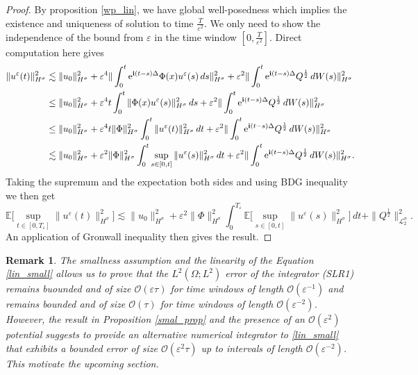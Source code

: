 \documentclass[a4paper]{amsart}
\newtheorem{remark}{Remark}[section]
\begin{document}
    \begin{proof}
By proposition \ref{wp_lin}, we have global well-posedness which implies the existence and uniqueness of solution to time $\frac{T}{\varepsilon^2}$. We only need to show the independence of the bound from $\varepsilon$ in the time window $[0,\frac{T}{\varepsilon^2}]$. Direct computation here gives 
$$
\begin{aligned}
\|u^\varepsilon(t)\|^{2}_{H^\sigma}&\lesssim \|u_0\|_{H^\sigma}^{2}+\varepsilon^{4}\|\int_{0}^{t}{\rm e}^{{\bf i}(t-s)\Delta}\Phi(x)u^\varepsilon(s)\,ds\|_{H^\sigma}^{2}+\varepsilon^{2}
\|\int_{0}^{t}{\rm e}^{{\bf i}(t-s)\Delta}Q^{\frac{1}{2}}\,dW(s)\|_{H^\sigma}^{2}\\
&\le \|u_0\|_{H^\sigma}^{2}+\varepsilon^{4} t \int_{0}^{t}\|\Phi(x)u^\varepsilon(s)\|^2_{H^\sigma}\,ds+\varepsilon^{2}
\|\int_{0}^{t}{\rm e}^{{\bf i}(t-s)\Delta}Q^{\frac{1}{2}}\,dW(s)\|_{H^\sigma}^{2}\\
&\le \|u_0\|_{H^\sigma}^{2}+\varepsilon^{4}t \|\Phi\|_{H^\sigma}^{2}\int_{0}^{t}\|u^\varepsilon(t)\|^{2}_{H^\sigma}\,dt+\varepsilon^{2}
\|\int_{0}^{t}{\rm e}^{{\bf i}(t-s)\Delta}Q^{\frac{1}{2}}\,dW(s)\|_{H^\sigma}^{2}\\
&\lesssim \|u_0\|_{H^\sigma}^{2}+\varepsilon^2 \|\Phi\|_{H^\sigma}^{2}\int_{0}^{t}\sup_{s\in[0,t]}\|u^\varepsilon(s)\|^{2}_{H^\sigma}\,dt+\varepsilon^{2}
\|\int_{0}^{t}{\rm e}^{{\bf i}(t-s)\Delta}Q^{\frac{1}{2}}\,dW(s)\|_{H^\sigma}^{2}.
\end{aligned}
$$
Taking the supremum and the expectation both sides and using BDG inequality we then get
$$
\mathbb{E}\big[\displaystyle\sup_{t\in [0,T_\varepsilon]}\|u^\varepsilon(t)\|^{2}_{H^\sigma}\big]\lesssim \|u_0\|^{2}_{ H^\sigma}
+\varepsilon^{2}\|\Phi\|_{H^\sigma}^{2} \int_{0}^{T_\varepsilon}\mathbb{E}\big[\sup_{s\in[0,t]}\|u^\varepsilon(s)\|^{2}_{H^\sigma}\big]\,dt+\|Q^{\frac{1}{2}}\|_{\mathcal{L}_2^\sigma}^2.
$$
An application of Gronwall inequality then gives the result.
\end{proof}

\begin{remark}
    The smallness assumption and the linearity of the Equation \eqref{lin_small} allows us to prove that the $L^2(\Omega; L^2)$ error of the integrator (SLR1) remains buounded and of size $\mathcal{O}(\varepsilon\tau)$ for time windows of length $\mathcal{O}(\varepsilon^{-1})$ and remains bounded and of size $\mathcal{O}(\tau)$ for time windows of length $\mathcal{O}(\varepsilon^{-2})$. However, the result in Proposition \ref{smal_prop} and the presence of an $\mathcal{O}(\varepsilon^2)$ potential suggests to provide an alternative numerical integrator to \eqref{lin_small} that exhibits a bounded error of size $\mathcal{O}(\varepsilon^2 \tau)$ up to intervals of length $\mathcal{O}(\varepsilon^{-2})$. This motivate the upcoming section.
\end{remark}
\end{document}
